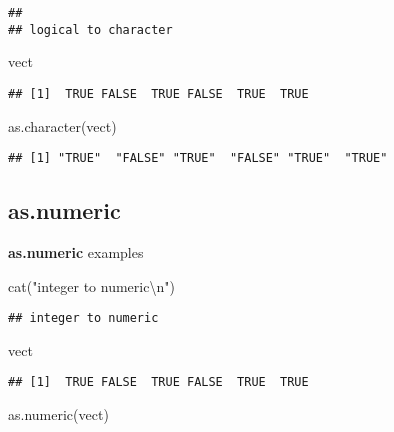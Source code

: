 \documentclass[
]{article}
\newenvironment{Shaded}{\begin{snugshade}}{\end{snugshade}}
\newcommand{\FunctionTok}[1]{\textcolor[rgb]{0.00,0.00,0.00}{#1}}
\newcommand{\NormalTok}[1]{#1}
\newcommand{\SpecialCharTok}[1]{\textcolor[rgb]{0.00,0.00,0.00}{#1}}
\newcommand{\StringTok}[1]{\textcolor[rgb]{0.31,0.60,0.02}{#1}}
\begin{document}
\begin{verbatim}
## 
## logical to character
\end{verbatim}

\begin{Shaded}
\begin{Highlighting}[]
\NormalTok{vect}
\end{Highlighting}
\end{Shaded}

\begin{verbatim}
## [1]  TRUE FALSE  TRUE FALSE  TRUE  TRUE
\end{verbatim}

\begin{Shaded}
\begin{Highlighting}[]
\FunctionTok{as.character}\NormalTok{(vect)}
\end{Highlighting}
\end{Shaded}

\begin{verbatim}
## [1] "TRUE"  "FALSE" "TRUE"  "FALSE" "TRUE"  "TRUE"
\end{verbatim}

\hypertarget{as.numeric}{%
\subsection{as.numeric}\label{as.numeric}}

\textbf{as.numeric} examples

\begin{Shaded}
\begin{Highlighting}[]
\FunctionTok{cat}\NormalTok{(}\StringTok{"integer to numeric}\SpecialCharTok{\textbackslash{}n}\StringTok{"}\NormalTok{)}
\end{Highlighting}
\end{Shaded}

\begin{verbatim}
## integer to numeric
\end{verbatim}

\begin{Shaded}
\begin{Highlighting}[]
\NormalTok{vect}
\end{Highlighting}
\end{Shaded}

\begin{verbatim}
## [1]  TRUE FALSE  TRUE FALSE  TRUE  TRUE
\end{verbatim}

\begin{Shaded}
\begin{Highlighting}[]
\FunctionTok{as.numeric}\NormalTok{(vect)}
\end{Highlighting}
\end{Shaded}
\end{document}
